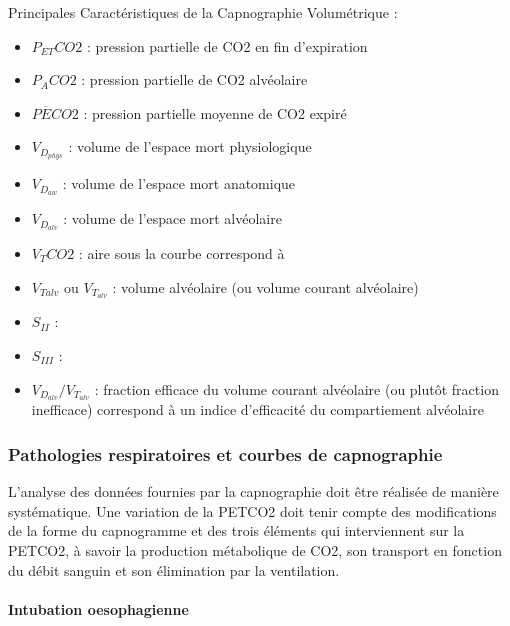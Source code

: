 \documentclass[12pt,]{article}
\providecommand{\tightlist}{%
  \setlength{\itemsep}{0pt}\setlength{\parskip}{0pt}}
\let\oldparagraph\paragraph
\renewcommand{\paragraph}[1]{\oldparagraph{#1}\mbox{}}
\begin{document}
Principales Caractéristiques de la Capnographie Volumétrique :

\begin{itemize}
\tightlist
\item
  \(P_{ET}CO2\) : pression partielle de CO2 en fin d'expiration
\item
  \(P_{A}CO2\) : pression partielle de CO2 alvéolaire
\item
  \(P\overline{E}CO2\) : pression partielle moyenne de CO2 expiré
\item
  \(V_{D_{phys}}\) : volume de l'espace mort physiologique
\item
  \(V_{D_{aw}}\) : volume de l'espace mort anatomique
\item
  \(V_{D_{alv}}\) : volume de l'espace mort alvéolaire
\item
  \(V_{T}CO2\) : aire sous la courbe correspond à
\item
  \(V_{Talv}\) ou \(V_{T_{alv}}\) : volume alvéolaire (ou volume courant
  alvéolaire)
\item
  \(S_{II}\) :
\item
  \(S_{III}\) :
\item
  \(V_{D_{alv}}/V_{T_{alv}}\) : fraction efficace du volume courant
  alvéolaire (ou plutôt fraction inefficace) correspond à un indice
  d'efficacité du compartiement alvéolaire
\end{itemize}

\hypertarget{pathologies-respiratoires-et-courbes-de-capnographie}{%
\subsubsection{Pathologies respiratoires et courbes de
capnographie}\label{pathologies-respiratoires-et-courbes-de-capnographie}}

L'analyse des données fournies par la capnographie doit être réalisée de
manière systématique. Une variation de la PETCO2 doit tenir compte des
modifications de la forme du capnogramme et des trois éléments qui
interviennent sur la PETCO2, à savoir la production métabolique de CO2,
son transport en fonction du débit sanguin et son élimination par la
ventilation.

\hypertarget{intubation-oesophagienne}{%
\paragraph{Intubation oesophagienne}\label{intubation-oesophagienne}}
\end{document}
